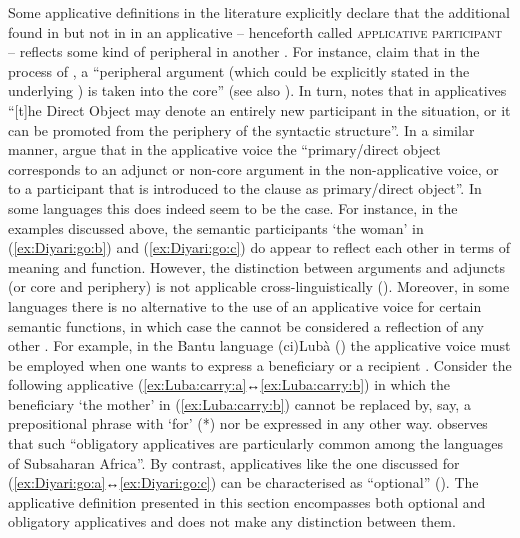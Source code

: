 Some applicative definitions in the literature explicitly declare that the additional  found in  but not in  in an applicative  -- henceforth called \textsc{applicative participant} -- reflects some kind of peripheral  in another . For instance, \citet[13]{dixon:aikhenvald:2000} claim that in the process of , a “peripheral argument (which could be explicitly stated in the underlying ) is taken into the core” (see also \citealt[32]{dixon:2000}). In turn, \citet[389]{kulikov:2010} notes that in applicatives “[t]he Direct Object may denote an entirely new participant in the situation, or it can be promoted from the periphery of the syntactic structure”. In a similar manner, \citet[53]{zuniga:kittila:2019} argue that in the applicative voice the “primary/direct object corresponds to an adjunct or non-core argument in the non-applicative voice, or to a participant that is introduced to the clause as primary/direct object”. In some languages this does indeed seem to be the case. For instance, in the  examples discussed above, the semantic participants ‘the woman’ in (\ref{ex:Diyari:go:b}) and (\ref{ex:Diyari:go:c}) do appear to reflect each other in terms of meaning and function. However, the distinction between arguments and adjuncts (or core and periphery) is not applicable cross-linguistically (). Moreover, in some languages there is no alternative to the use of an applicative voice for certain semantic functions, in which case the  cannot be considered a reflection of any other . For example, in the Bantu language (ci)Lubà () the applicative voice must be employed when one wants to express a beneficiary or a recipient \citep[104f., 107, 116]{de-kind:bostoen:2012}. Consider the following  applicative  (\ref{ex:Luba:carry:a}↔\ref{ex:Luba:carry:b}) in which the beneficiary ‘the mother’ in (\ref{ex:Luba:carry:b}) cannot be replaced by, say, a prepositional phrase with  ‘for’ (*) nor be expressed in any other way. \citet[85]{creissels:2016} observes that such “obligatory applicatives are particularly common among the languages of Subsaharan Africa”. By contrast, applicatives like the one discussed for  (\ref{ex:Diyari:go:a}↔\ref{ex:Diyari:go:c}) can be characterised as “optional” (\citealt[45ff.]{peterson:2007}). The applicative definition presented in this section encompasses both optional and obligatory applicatives and does not make any distinction between them.

